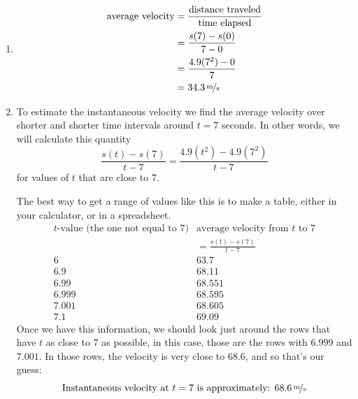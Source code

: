 \documentclass[oneside]{book}
\theoremstyle{definition}
\theoremstyle{solution}
\newtheorem*{solution}{Solution}
\newenvironment{solution}{\vspace{2in}\comment}{\endcomment}
\begin{document}
\begin{solution}
\begin{enumerate}
\item 
\begin{align*}
\text{average velocity} & = \frac{\text{distance traveled}}{\text{time elapsed}} \\
                         & = \frac{s(7) - s(0)} {7-0}                             \\
                       & = \frac{4.9(7^2)-0}{7}                                 \\
                       & = \unitfrac[34.3]{m}{s}
\end{align*}

\item To estimate the instantaneous velocity we find the average velocity over
shorter and shorter time intervals around $t = 7$ seconds.  In other
words, we will calculate this quantity
$$
\frac{s(t) - s(7)} {t-7} = \frac{4.9(t^2)-4.9(7^2)}{t-7}
$$
for values of $t$ that are close to $7$.  

The best way to get a range of values like this is to make a table,
either in your calculator, or in a spreadsheet.  
$$
\begin{array}{c|c}
\text{$t$-value (the one not equal to $7$)} & \text{average velocity from $t$ to $7$} \\
                        & = \frac{s(t)-s(7)}{t-7}                 \\ \hline
6                       & 63.7                                    \\
6.9                     & 68.11                                   \\
6.99                    & 68.551                                  \\
6.999                   & 68.595                                  \\
7.001                   & 68.605                                  \\
7.1                     & 69.09
\end{array}
$$
Once we have this information, we should look just around the rows
that have $t$ as close to $7$ as possible, in this case, those are the
rows with $6.999$ and $7.001$.  In those rows, the velocity is very
close to $68.6$, and so that's our guess:
$$
\text{Instantaneous velocity at $t=7$ is approximately: }
  \unitfrac[68.6]{m}{s}
$$
\end{enumerate}
\end{solution}
\end{document}
